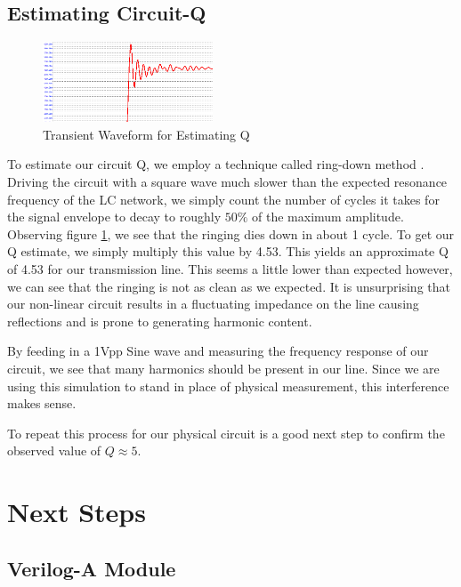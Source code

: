 \documentclass[journal]{IEEEtran} \usepackage[english]{babel}
\begin{document}
\subsection{Estimating Circuit-Q}

\begin{figure}[htb]
\centering
\includegraphics[width=0.45\textwidth]{EstimatingQ.png}
\caption{Transient Waveform for Estimating Q
}\label{fig:EstimQ}
\end{figure}


To estimate our circuit Q, we employ a technique called ring-down method
\cite{giangrandi}. Driving the circuit with a square wave much slower than the
expected resonance frequency of the LC network, we simply count the number of
cycles it takes for the signal envelope to decay to roughly $50\%$ of the maximum
amplitude. Observing figure \ref{fig:EstimQ}, we see that the ringing dies
down in about 1 cycle. To get our Q estimate, we simply multiply this value by 4.53. This yields an approximate Q of 4.53 for our transmission
line. This seems a little lower than expected however, we can see that the
ringing is not as clean as we expected.
It is unsurprising that our non-linear circuit results in a fluctuating
impedance on the line causing reflections and is prone to generating harmonic
content.

By feeding in a 1Vpp Sine wave and measuring the frequency response of our
circuit, we see that many harmonics should be present in our line. Since we are
using this simulation to stand in place of physical measurement, this
interference makes sense.

To repeat this process for our physical circuit is a good next step to confirm
the observed value of $Q \approx 5$.

\section{Next Steps}\label{sec:NextSteps}

\subsection{Verilog-A Module}
\end{document}
